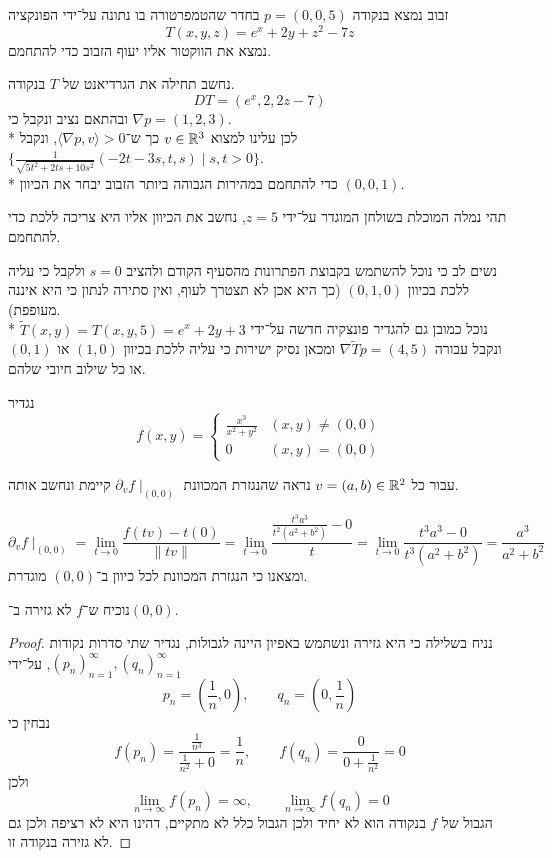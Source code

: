 \Question{}
\Subquestion{}
זבוב נמצא בנקודה $p = (0, 0, 5)$ בחדר שהטמפרטורה בו נתונה על־ידי הפונקציה
\[
	T(x, y, z) = e^x + 2y + z^2 - 7z
\]
נמצא את הווקטור אליו יעוף הזבוב כדי להתחמם.

נחשב תחילה את הגרדיאנט של $T$ בנקודה.
\[
	DT = (e^x, 2, 2z - 7)
\]
ובהתאם נציב ונקבל כי $\nabla p = (1, 2, 3)$. \\*
לכן עלינו למצוא $v \in \mathbb{R}^3$ כך ש־$\langle \nabla p, v \rangle > 0$, ונקבל $\{ \frac{1}{\sqrt{5t^2 + 2ts + 10s^2}}(-2t - 3s, t, s) \mid s, t > 0 \}$. \\*
כדי להתחמם במהירות הגבוהה ביותר הזבוב יבחר את הכיוון $(0, 0, 1)$.

\Subquestion{}
תהי נמלה המוכלת בשולחן המוגדר על־ידי $z = 5$, נחשב את הכיוון אליו היא צריכה ללכת כדי להתחמם.

נשים לב כי נוכל להשתמש בקבוצת הפתרונות מהסעיף הקודם ולהציב $s = 0$ ולקבל כי עליה ללכת בכיוון $(0, 1, 0)$ (כך היא אכן לא תצטרך לעוף, ואין סתירה לנתון כי היא איננה מעופפת). \\*
נוכל כמובן גם להגדיר פונצקיה חדשה על־ידי $\tilde{T}(x, y) = T(x, y, 5) = e^x + 2y + 3$ ונקבל עבורה $\nabla \tilde{T} p = (4, 5)$ ומכאן נסיק ישירות כי עליה ללכת בכיוון $(1, 0)$ או $(0, 1)$ או כל שילוב חיובי שלהם.

\Question{}
נגדיר
\[
	f(x, y) = \begin{cases}
		\frac{x^3}{x^2 + y^2} & (x, y) \ne (0, 0) \\
		0 & (x, y) = (0, 0)
	\end{cases}
\]

\Subquestion{}
עבור כל $v = (a, b) \in \mathbb{R}^2$ נראה שהנגזרת המכוונת $\partial_v f \mid_{(0, 0)}$ קיימת ונחשב אותה.

\[
	\partial_v f \mid_{(0, 0)}
	= \lim_{t \to 0} \frac{f(t v) - t(0)}{\lVert t v \rVert}
	= \lim_{t \to 0} \frac{\frac{t^3 a^3}{t^2 (a^2 + b^2)} - 0}{t}
	= \lim_{t \to 0} \frac{t^3 a^3 - 0}{t^3 (a^2 + b^2)}
	= \frac{a^3}{a^2 + b^2}
\]
ומצאנו כי הנגזרת המכוונת לכל כיוון ב־$(0, 0)$ מוגדרת.

\Subquestion{}
נוכיח ש־$f$ לא גזירה ב־$(0, 0)$.
\begin{proof}
	נניח בשלילה כי היא גזירה ונשתמש באפיון היינה לגבולות, נגדיר שתי סדרות נקודות ${(p_n)}_{n = 1}^\infty, {(q_n)}_{n = 1}^\infty$, על־ידי
	\[
		p_n = (\frac{1}{n}, 0),
		\qquad
		q_n = (0, \frac{1}{n})
	\]
	נבחין כי
	\[
		f(p_n) = \frac{\frac{1}{n^3}}{\frac{1}{n^2} + 0} = \frac{1}{n},
		\qquad
		f(q_n) = \frac{0}{0 + \frac{1}{n^2}} = 0
	\]
	ולכן
	\[
		\lim_{n \to \infty} f(p_n) = \infty,
		\qquad
		\lim_{n \to \infty} f(q_n) = 0
	\]
	הגבול של $f$ בנקודה הוא לא יחיד ולכן הגבול כלל לא מתקיים, דהינו היא לא רציפה ולכן גם לא גזירה בנקודה זו.
\end{proof}


